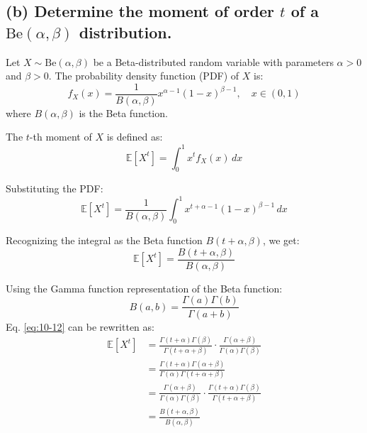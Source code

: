 


\newpage
\subsection*{(b) Determine the moment of order $t$ of a $\text{Be}(\alpha, \beta)$ distribution.}

Let \(X \sim \text{Be}(\alpha, \beta)\) be a Beta-distributed random variable with parameters \(\alpha > 0\) and \(\beta > 0\). The probability density function (PDF) of \(X\) is:
\begin{equation}
f_X(x) = \frac{1}{B(\alpha, \beta)} x^{\alpha - 1} (1 - x)^{\beta - 1}, \quad x \in (0, 1)
\end{equation}
where \(B(\alpha, \beta)\) is the Beta function.

The \(t\)-th moment of \(X\) is defined as:
\begin{equation}
\mathbb{E}[X^t] = \int_0^1 x^t f_X(x) \, dx
\end{equation}

Substituting the PDF:
\begin{equation}
\mathbb{E}[X^t] = \frac{1}{B(\alpha, \beta)} \int_0^1 x^{t + \alpha - 1} (1 - x)^{\beta - 1} \, dx
\end{equation}

Recognizing the integral as the Beta function \(B(t + \alpha, \beta)\), we get:
\begin{equation} \label{eq:10-12}
\mathbb{E}[X^t] = \frac{B(t + \alpha, \beta)}{B(\alpha, \beta)}
\end{equation}

Using the Gamma function representation of the Beta function:
\begin{equation}
B(a, b) = \frac{\Gamma(a) \Gamma(b)}{\Gamma(a + b)}
\end{equation}
Eq. \ref{eq:10-12} can be rewritten as:
\begin{align}
\mathbb{E}[X^t] &= \frac{\Gamma(t + \alpha) \Gamma(\beta)}{\Gamma(t + \alpha + \beta)} \cdot \frac{\Gamma(\alpha + \beta)}{\Gamma(\alpha) \Gamma(\beta)} \\
&= \frac{\Gamma(t + \alpha) \Gamma(\alpha + \beta)}{\Gamma(\alpha) \Gamma(t + \alpha + \beta)} \\
&= \frac{\Gamma(\alpha + \beta)}{\Gamma(\alpha) \Gamma(\beta)} \cdot \frac{\Gamma(t + \alpha) \Gamma(\beta)}{\Gamma(t + \alpha + \beta)} \\
&= \frac{B(t + \alpha, \beta)}{B(\alpha, \beta)}
\end{align}

